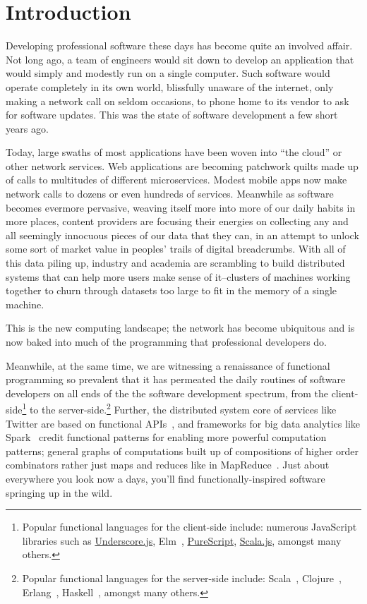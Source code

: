 \chapter{Introduction}

Developing professional software these days has become quite an involved affair.
Not long ago, a team of engineers would sit down to develop an application that
would simply and modestly run on a single computer. Such software would operate
completely in its own world, blissfully unaware of the internet, only making a
network call on seldom occasions, \eg to phone home to its vendor to ask for
software updates. This was the state of software development a few short years
ago.


Today, large swaths of most applications have been woven into ``the cloud'' or
other network services. Web applications are becoming patchwork quilts made up
of calls to multitudes of different microservices. Modest mobile apps now make
network calls to dozens or even hundreds of services. Meanwhile as software
becomes evermore pervasive, weaving itself more into more of our daily habits in
more places, content providers are focusing their energies on collecting any and
all seemingly innocuous pieces of our data that they can, in an attempt to
unlock some sort of market value in peoples' trails of digital breadcrumbs. With
all of this data piling up, industry and academia are scrambling to build
distributed systems that can help more users make sense of it--clusters of
machines working together to churn through datasets too large to fit in the
memory of a single machine.

This is the new computing landscape; the network has become ubiquitous and is
now baked into much of the programming that professional developers do.

Meanwhile, at the same time, we are witnessing a renaissance of functional
programming so prevalent that it has permeated the daily routines of software
developers on all ends of the the software development spectrum, from the
client-side\footnote{Popular functional languages for the client-side include:
numerous JavaScript libraries such as
\href{http://underscorejs.org}{Underscore.js}, Elm~\cite{Elm},
\href{http://www.purescript.org/}{PureScript},
\href{http://www.scala-js.org/}{Scala.js}, amongst many others.} to the
server-side.\footnote{Popular functional languages for the server-side include:
Scala~\cite{Odersky10}, Clojure~\cite{Clojure}, Erlang~\cite{Erlang},
Haskell~\cite{Haskell}, amongst many others.} Further, the distributed system
core of services like Twitter are based on functional APIs~\cite{Eriksen2013},
and frameworks for big data analytics like Spark~\cite{Spark} credit functional
patterns for enabling more powerful computation patterns; \ie general graphs of
computations built up of compositions of higher order combinators rather just
maps and reduces like in MapReduce~\cite{MateiScalaByTheBay}. Just about
everywhere you look now a days, you'll find functionally-inspired software
springing up in the wild.


